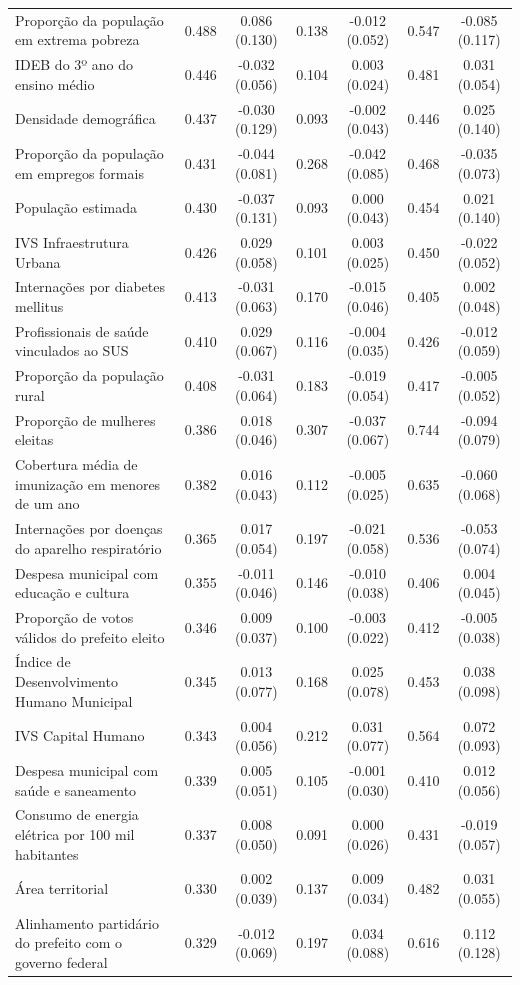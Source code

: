 \begin{table}
\begin{tabular}{lcccccc}
Proporção da população em extrema pobreza & 0.488 & 0.086 (0.130) & 0.138 & -0.012 (0.052) & 0.547 & -0.085 (0.117) \\
IDEB do 3º ano do ensino médio & 0.446 & -0.032 (0.056) & 0.104 & 0.003 (0.024) & 0.481 & 0.031 (0.054) \\
Densidade demográfica & 0.437 & -0.030 (0.129) & 0.093 & -0.002 (0.043) & 0.446 & 0.025 (0.140) \\
Proporção da população em empregos formais & 0.431 & -0.044 (0.081) & 0.268 & -0.042 (0.085) & 0.468 & -0.035 (0.073) \\
População estimada & 0.430 & -0.037 (0.131) & 0.093 & 0.000 (0.043) & 0.454 & 0.021 (0.140) \\
IVS Infraestrutura Urbana & 0.426 & 0.029 (0.058) & 0.101 & 0.003 (0.025) & 0.450 & -0.022 (0.052) \\
Internações por diabetes mellitus & 0.413 & -0.031 (0.063) & 0.170 & -0.015 (0.046) & 0.405 & 0.002 (0.048) \\
Profissionais de saúde vinculados ao SUS & 0.410 & 0.029 (0.067) & 0.116 & -0.004 (0.035) & 0.426 & -0.012 (0.059) \\
Proporção da população rural & 0.408 & -0.031 (0.064) & 0.183 & -0.019 (0.054) & 0.417 & -0.005 (0.052) \\
Proporção de mulheres eleitas & 0.386 & 0.018 (0.046) & 0.307 & -0.037 (0.067) & 0.744 & -0.094 (0.079) \\
Cobertura média de imunização em menores de um ano & 0.382 & 0.016 (0.043) & 0.112 & -0.005 (0.025) & 0.635 & -0.060 (0.068) \\
Internações por doenças do aparelho respiratório & 0.365 & 0.017 (0.054) & 0.197 & -0.021 (0.058) & 0.536 & -0.053 (0.074) \\
Despesa municipal com educação e cultura & 0.355 & -0.011 (0.046) & 0.146 & -0.010 (0.038) & 0.406 & 0.004 (0.045) \\
Proporção de votos válidos do prefeito eleito & 0.346 & 0.009 (0.037) & 0.100 & -0.003 (0.022) & 0.412 & -0.005 (0.038) \\
Índice de Desenvolvimento Humano Municipal & 0.345 & 0.013 (0.077) & 0.168 & 0.025 (0.078) & 0.453 & 0.038 (0.098) \\
IVS Capital Humano & 0.343 & 0.004 (0.056) & 0.212 & 0.031 (0.077) & 0.564 & 0.072 (0.093) \\
Despesa municipal com saúde e saneamento & 0.339 & 0.005 (0.051) & 0.105 & -0.001 (0.030) & 0.410 & 0.012 (0.056) \\
Consumo de energia elétrica por 100 mil habitantes & 0.337 & 0.008 (0.050) & 0.091 & 0.000 (0.026) & 0.431 & -0.019 (0.057) \\
Área territorial & 0.330 & 0.002 (0.039) & 0.137 & 0.009 (0.034) & 0.482 & 0.031 (0.055) \\
Alinhamento partidário do prefeito com o governo federal & 0.329 & -0.012 (0.069) & 0.197 & 0.034 (0.088) & 0.616 & 0.112 (0.128) \\
\bottomrule
\end{tabular}
\end{table}
